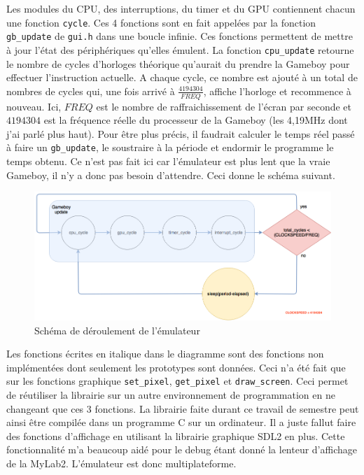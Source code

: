 \documentclass[a4paper]{article}
\begin{document}
Les modules du CPU, des interruptions, du timer et du GPU contiennent chacun une
fonction \texttt{cycle}. Ces 4 fonctions sont en fait appelées par la fonction
\texttt{gb_update} de \texttt{gui.h} dans une boucle infinie. Ces
fonctions permettent de mettre à jour l'état des périphériques qu'elles émulent.
La fonction \texttt{cpu_update} retourne le nombre de cycles d'horloges
théorique qu'aurait du prendre la Gameboy pour effectuer l'instruction actuelle.
A chaque cycle, ce nombre est ajouté à un total de nombres de cycles qui, une fois
arrivé à $\frac{4194304}{FREQ}$, affiche l'horloge et recommence à nouveau. Ici,
$FREQ$  est le nombre de raffraichissement de l'écran par seconde et $4194304$ est 
la fréquence réelle du processeur de la Gameboy (les 4,19MHz dont j'ai parlé plus haut).
Pour être plus précis, il faudrait calculer le temps réel passé à faire un \texttt{gb_update},
le soustraire à la période et endormir le programme le temps obtenu. Ce n'est pas
fait ici car l'émulateur est plus lent que la vraie Gameboy, il n'y a donc pas
besoin d'attendre. Ceci donne le schéma suivant. \\
\begin{figure}[!h]
  \centering
  \includegraphics[scale=0.4]{images/schema.png}
  \caption{Schéma de déroulement de l'émulateur}
\end{figure}
\newline

Les fonctions écrites en italique dans le diagramme sont des fonctions non implémentées
dont seulement les prototypes sont données. Ceci n'a été fait que sur les fonctions
graphique \texttt{set_pixel}, \texttt{get_pixel} et \texttt{draw_screen}.
Ceci permet de réutiliser la librairie sur un autre environnement de programmation
en ne changeant que ces 3 fonctions. La librairie faite durant ce travail de semestre
peut ainsi être compilée dans un programme C sur un ordinateur. Il a juste fallut
faire des fonctions d'affichage en utilisant la librairie graphique SDL2 en plus.
Cette fonctionnalité m'a beaucoup aidé pour le debug étant donné la lenteur d'affichage
de la MyLab2. L'émulateur est donc multiplateforme. \\
\end{document}
